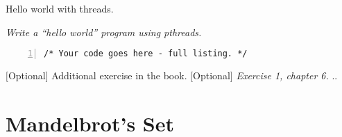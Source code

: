 \documentclass{article}
\begin{document}
\begin{ExerciseList}
\Exercise Hello world with threads.

\Question \emph{Write a ``hello world'' program using pthreads.} 

\begin{lstlisting}[basicstyle=\small\sffamily,
keywords={break,case,const,continue,default,else,enum,
for,if,return,switch,while,do,long,void,int,float,double,
char,struct,typedef,include,size\_t},
keywordstyle={\color{blue}},
comment={[l]{//}}, morecomment={[s]{/*}{*/}}, commentstyle=\itshape,
columns={[l]flexible}, numbers=left, numberstyle=\tiny,
frameround=fftt, frame=shadowbox, captionpos=b,
caption={Hello world with pthreads.},
label=LST:hello]
/* Your code goes here - full listing. */
\end{lstlisting}


\Exercise $[$Optional$]$ Additional exercise in the book.
\Question $[$Optional$]$ \emph{Exercise 1, chapter 6.}
\Answer .. %

\end{ExerciseList}

\section{Mandelbrot's Set}
\end{document}

